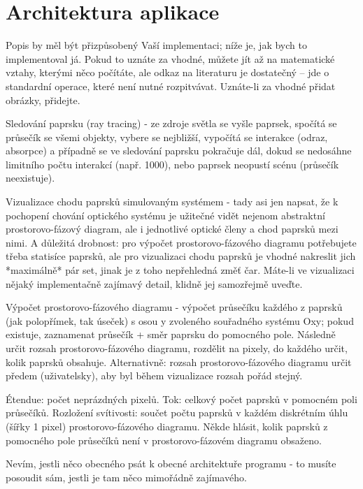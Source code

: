 \section{Architektura aplikace}



Popis by měl být přizpůsobený Vaší implementaci; níže je, jak bych to
implementoval já. Pokud to uznáte za vhodné, můžete jít až na
matematické vztahy, kterými něco počítáte, ale odkaz na literaturu je
dostatečný -- jde o standardní operace, které není nutné rozpitvávat.
Uznáte-li za vhodné přidat obrázky, přidejte.

Sledování paprsku (ray tracing) - ze zdroje světla se vyšle paprsek,
spočítá se průsečík se všemi objekty, vybere se nejbližší, vypočítá se
interakce (odraz, absorpce) a případně se ve sledování paprsku pokračuje
dál, dokud se nedosáhne limitního počtu interakcí (např. 1000), nebo
paprsek neopustí scénu (průsečík neexistuje).

Vizualizace chodu paprsků simulovaným systémem - tady asi jen napsat, že
k pochopení chování optického systému je užitečné vidět nejenom
abstraktní prostorovo-fázový diagram, ale i jednotlivé optické členy a
chod paprsků mezi nimi. A důležitá drobnost: pro výpočet
prostorovo-fázového diagramu potřebujete třeba statisíce paprsků, ale
pro vizualizaci chodu paprsků je vhodné nakreslit jich *maximálně* pár
set, jinak je z toho nepřehledná změť čar. Máte-li ve vizualizaci nějaký
implementačně zajímavý detail, klidně jej samozřejmě uveďte.

Výpočet prostorovo-fázového diagramu - výpočet průsečíku každého z
paprsků (jak polopřímek, tak úseček) s osou y zvoleného souřadného
systému Oxy; pokud existuje, zaznamenat průsečík + směr paprsku do
pomocného pole. Následně určit rozsah prostorovo-fázového diagramu,
rozdělit na pixely, do každého určit, kolik paprsků obsahuje.
Alternativně: rozsah prostorovo-fázového diagramu určit předem
(uživatelsky), aby byl během vizualizace rozsah pořád stejný.

Étendue: počet neprázdných pixelů. Tok: celkový počet paprsků v pomocném
poli průsečíků. Rozložení svítivosti: součet počtu paprsků v každém
diskrétním úhlu (šířky 1 pixel) prostorovo-fázového diagramu. Někde
hlásit, kolik paprsků z pomocného pole průsečíků není v
prostorovo-fázovém diagramu obsaženo.

Nevím, jestli něco obecného psát k obecné architektuře programu - to
musíte posoudit sám, jestli je tam něco mimořádně zajímavého.